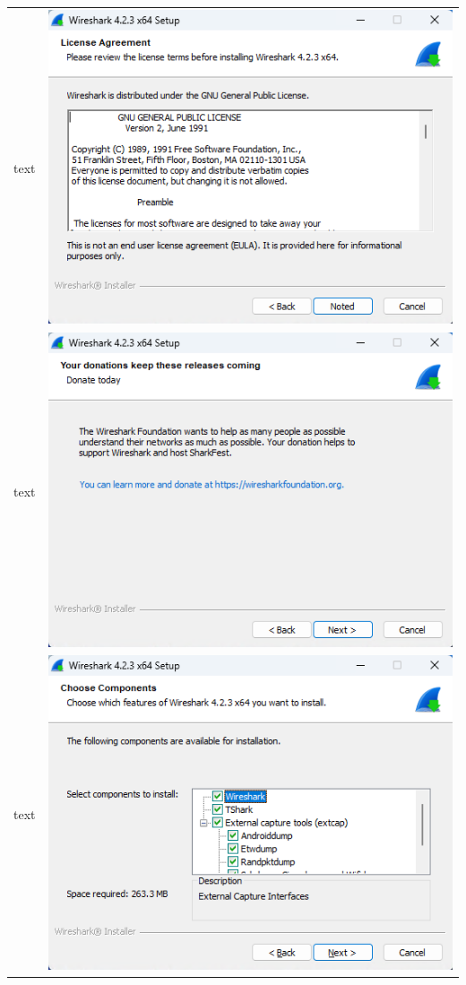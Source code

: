 \documentclass[11pt]{report}
\begin{document}
\begin{tabular}{ l r }
            text & \includegraphics[scale=1.0]{wireshark03} \\
            text & \includegraphics[scale=1.0]{wireshark04} \\
            text & \includegraphics[scale=1.0]{wireshark05} \\

\end{tabular}
\end{document}
